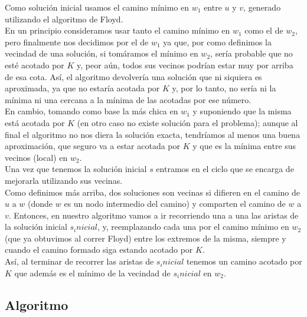 Como soluci\'on inicial usamos el camino m\'inimo en $w_1$ entre $u$ y $v$, generado utilizando el algoritmo de Floyd.\\
En un principio consideramos usar tanto el camino m\'inimo en $w_1$ como el de $w_2$, pero finalmente nos decidimos por el de $w_1$ ya que, por como definimos la vecindad de una soluci\'on, si tom\'aramos el m\'inimo en $w_2$, ser\'ia probable que no est\'e acotado por $K$ y, peor a\'un, todos sus vecinos podr\'ian estar muy por arriba de esa cota. As\'i, el algoritmo devolver\'ia una soluci\'on que ni siquiera es aproximada, ya que no estar\'ia acotada por $K$ y, por lo tanto, no ser\'ia ni la m\'inima ni una cercana a la m\'inima de las acotadas por ese n\'umero.\\
En cambio, tomando como base la m\'as chica en $w_1$ y suponiendo que la misma est\'a acotada por $K$ (en otro caso no existe soluci\'on para el problema); aunque al final el algoritmo no nos diera la soluci\'on exacta, tendr\'iamos al menos una buena aproximaci\'on, que seguro va a estar acotada por $K$ y que es la m\'inima entre sus vecinos (local) en $w_2$.\\
Una vez que tenemos la soluci\'on inicial $s$ entramos en el ciclo que se encarga de mejorarla utilizando sus vecinas.\\
Como definimos m\'as arriba, dos soluciones son vecinas si difieren en el camino de $u$ a $w$ (donde $w$ es un nodo intermedio del camino) y comparten el camino de $w$ a $v$. Entonces, en nuestro algoritmo vamos a ir recorriendo una a una las aristas de la soluci\'on inicial $s_inicial$, y, reemplazando cada una por el camino m\'inimo en $w_2$ (que ya obtuvimos al correr Floyd) entre los extremos de la misma, siempre y cuando el camino formado siga estando acotado por $K$.\\ 
As\'i, al terminar de recorrer las aristas de $s_inicial$ tenemos un camino acotado por $K$ que adem\'as es el m\'inimo de la vecindad de $s_inicial$ en $w_2$.\\

\newpage
\subsection{Algoritmo}
